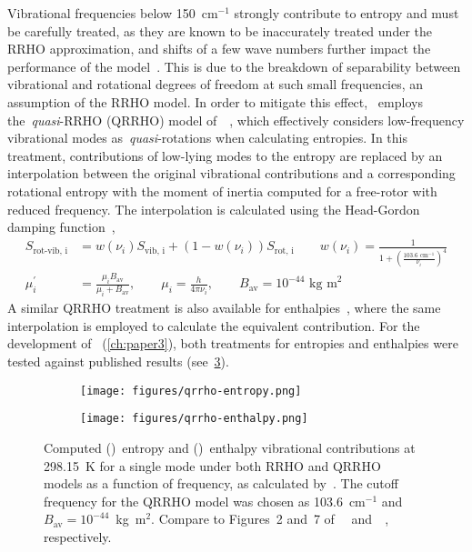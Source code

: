 Vibrational frequencies below 150~cm$^{-1}$ strongly contribute to entropy and must be carefully treated,
as they are known to be inaccurately treated under the RRHO approximation,
and shifts of a few wave numbers further impact the performance of the model~\cite{Ribeiro_2011,Grimme_2012,Jensen_2015,Ryu_2018}.
This is due to the breakdown of separability between vibrational and rotational degrees of freedom at such small frequencies,
an assumption of the RRHO model.
In order to mitigate this effect,
\overreact{}~employs the~\emph{quasi}-RRHO (QRRHO) model of~\citeauthor{Grimme_2012}~\cite{Grimme_2012},
which effectively considers low-frequency vibrational modes as~\emph{quasi}-rotations when calculating entropies.
In this treatment,
contributions of low-lying modes to the entropy are replaced by an interpolation between the original vibrational contributions and a corresponding rotational entropy with the moment of inertia computed for a free-rotor with reduced frequency.
The interpolation is calculated using the Head-Gordon damping function~\cite{Chai_2008},
%
\begin{equation}
	\begin{split}
		S_\text{rot-vib,
			i}
		&= w(\nu_i) S_\text{vib,
			i}
		+ \left(
		1 - w(\nu_i)
		\right) S_\text{rot,
			i}
		\qquad
		w(\nu_i) = \frac{1}{
			1 + \left(
			\frac{
				103.6 \text{ cm}^{-1}
			}{\nu_i}
			\right)^4
		} \\
		\mu^\prime_i &= \frac{\mu_i B_\text{av}}{\mu_i + B_\text{av}},
		\qquad
		\mu_i = \frac{h}{4 \pi \nu_i},
		\qquad
		B_\text{av} = 10^{-44} \text{ kg m}^2
	\end{split}
\end{equation}
%
A similar QRRHO treatment is also available for enthalpies~\cite{Li_2015},
where the same interpolation is employed to calculate the equivalent contribution.
For the development of~\overreact{} (\cref{ch:paper3}),
both treatments for entropies and enthalpies were tested against published results (see~\cref{fig:qrrho}).
%
\begin{figure}[hbtp]
	\centering
	\begin{subfigure}[c]{0.5\textwidth}
		\centering
		\texttt{[image: figures/qrrho-entropy.png]}
		\caption{}\label{fig:qrrho-entropy}
	\end{subfigure}%
	\begin{subfigure}[c]{0.5\textwidth}
		\centering
		\texttt{[image: figures/qrrho-enthalpy.png]}
		\caption{}\label{fig:qrrho-enthalpy}
	\end{subfigure}%
	\caption[Computed entropy
		and enthalpy vibrational contributions
		for a single mode under both RRHO and QRRHO.]{Computed ()~entropy
		and ()~enthalpy vibrational contributions
		at 298.15~K for a single mode under both RRHO and QRRHO~\cite{Grimme_2012,Li_2015} models
		as a function of frequency,
		as calculated by~\overreact{}.
		The cutoff frequency for the QRRHO model was chosen as 103.6~cm$^{-1}$ and~$B_\text{av} = 10^{-44}$~kg~m$^2$.
		Compare to Figures~2 and~7 of~\citeauthor{Grimme_2012}~\cite{Grimme_2012} and~\citeauthor{Li_2015}~\cite{Li_2015},
		respectively.}\label{fig:qrrho}
\end{figure}
